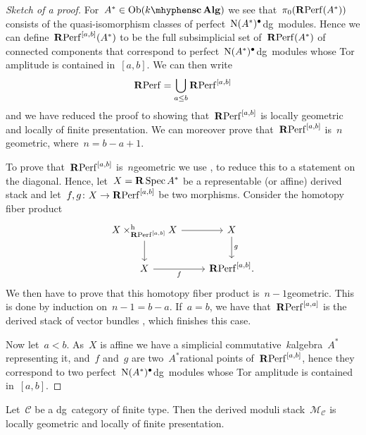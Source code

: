 \begin{refsection}
\begin{theorem}
\begin{proof}[Sketch of a proof]
    For~$A^*\in\Ob(\scAlg{k})$ we see that~$\pi_0(\mathbf{R}\mathrm{Perf}(A^*))$ consists of the quasi-isomorphism classes of perfect~$\operatorname{N}(A^*)^\bullet$\dash dg~modules. Hence we can define~$\mathbf{R}\mathrm{Perf}^{[a,b]}(A^*)$ to be the full subsimplicial set of~$\mathbf{R}\mathrm{Perf}(A^*)$ of connected components that correspond to perfect~$\operatorname{N}(A^*)^\bullet$\dash dg~modules whose Tor amplitude is contained in~$[a,b]$. We can then write
    \begin{equation}
      \mathbf{R}\mathrm{Perf}=\bigcup_{a\leq b}\mathbf{R}\mathrm{Perf}^{[a,b]}
    \end{equation}
    and we have reduced the proof to showing that~$\mathbf{R}\mathrm{Perf}^{[a,b]}$ is locally geometric and locally of finite presentation. We can moreover prove that~$\mathbf{R}\mathrm{Perf}^{[a,b]}$ is~$n$\dash geometric, where~$n=b-a+1$.

    To prove that~$\mathbf{R}\mathrm{Perf}^{[a,b]}$ is~$n$\dash geometric we use \cite[lemma 2.18]{toen-vaquie}, to reduce this to a statement on the diagonal. Hence, let~$X=\mathbf{R}\operatorname{Spec} A^*$ be a representable (or affine) derived stack and let~$f,g\colon X\to\mathbf{R}\mathrm{Perf}^{[a,b]}$ be two morphisms. Consider the homotopy fiber product
    \begin{equation}
      \begin{tikzcd}
        X\times_{\RPerf^{[a,b]}}^{\mathrm{h}}X \arrow{r} \arrow{d} & X \arrow{d}{g} \\
        X \arrow[swap]{r}{f} & \RPerf^{[a,b]}.
      \end{tikzcd}
    \end{equation}
    We then have to prove that this homotopy fiber product is~$n-1$\dash geometric. This is done by induction on~$n-1=b-a$. If~$a=b$, we have that~$\mathbf{R}\mathrm{Perf}^{[a,a]}$ is the derived stack of vector bundles \cite[corollary 1.3.7.4]{hagII}, which finishes this case.

    Now let~$a<b$. As~$X$ is affine we have a simplicial commutative~$k$\dash algebra~$A^*$ representing it, and~$f$ and~$g$ are two~$A^*$\dash rational points of~$\mathbf{R}\mathrm{Perf}^{[a,b]}$, hence they correspond to two perfect~$\operatorname{N}(A^*)^\bullet$\dash dg~modules whose Tor amplitude is contained in~$[a,b]$.

  \end{proof}
\end{theorem}

\begin{theorem}
  \label{theorem:main-theorem}
  Let~$\mathcal{C}$ be a dg~category of finite type. Then the derived moduli stack~$\mathcal{M}_{\mathcal{C}}$ is locally geometric and locally of finite presentation.


\end{theorem}
\end{refsection}
